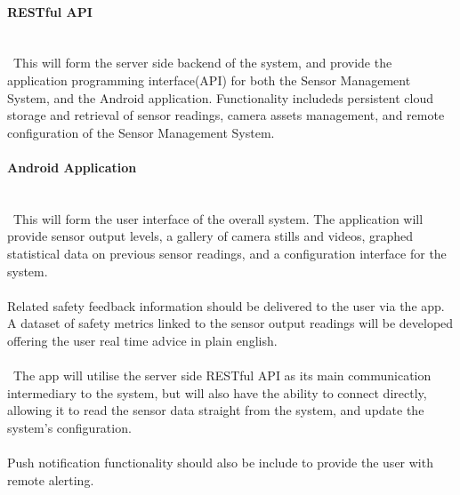 \documentclass{article}
\begin{document}
\paragraph{RESTful API}
\noindent
\\\
This will form the server side backend of the system, and provide the application programming interface(API) for both the Sensor Management System, and the Android application. Functionality includeds persistent cloud storage and retrieval of sensor readings, camera assets management, and remote configuration of the Sensor Management System.

\paragraph{Android Application}
\noindent
\\\
This will form the user interface of the overall system. The application will provide sensor output levels, a gallery of camera stills and videos, graphed statistical data on previous sensor readings, and a configuration interface for the system.\\\\
Related safety feedback information should be delivered to the user via the app. A dataset of safety metrics linked to the sensor output readings will be developed offering the user real time advice in plain english.\\\\\
The app will utilise the server side RESTful API as its main communication intermediary to the system, but will also have the ability to connect directly, allowing it to read the sensor data straight from the system, and update the system’s configuration. \\\\
Push notification functionality should also be include to provide the user with remote alerting.
\end{document}
